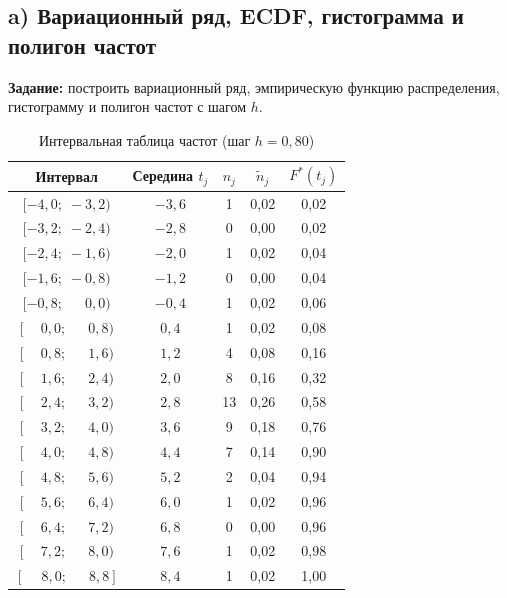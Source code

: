 \documentclass[12pt,a4paper]{article}
\begin{document}
	\subsection{a) Вариационный ряд, ECDF, гистограмма и полигон частот}
	
	\textbf{Задание:} построить вариационный ряд, эмпирическую функцию распределения,
	гистограмму и полигон частот с шагом $h$.
	
	\begin{table}[H]
		\centering
		\small
		\begin{tabular}{ccccc}
			\toprule
			Интервал & Середина $t_j$ & $n_j$ & $\tilde{n}_j$ & $F^*(t_j)$ \\
			\midrule
			$[-4{,}0;\;-3{,}2)$ & $-3{,}6$ &  1 & 0{,}02 & 0{,}02 \\
			$[-3{,}2;\;-2{,}4)$ & $-2{,}8$ &  0 & 0{,}00 & 0{,}02 \\
			$[-2{,}4;\;-1{,}6)$ & $-2{,}0$ &  1 & 0{,}02 & 0{,}04 \\
			$[-1{,}6;\;-0{,}8)$ & $-1{,}2$ &  0 & 0{,}00 & 0{,}04 \\
			$[-0{,}8;\;\phantom{-}0{,}0)$ & $-0{,}4$ & 1 & 0{,}02 & 0{,}06 \\
			$[\phantom{-}0{,}0;\;\phantom{-}0{,}8)$ & $0{,}4$ & 1 & 0{,}02 & 0{,}08 \\
			$[\phantom{-}0{,}8;\;\phantom{-}1{,}6)$ & $1{,}2$ & 4 & 0{,}08 & 0{,}16 \\
			$[\phantom{-}1{,}6;\;\phantom{-}2{,}4)$ & $2{,}0$ & 8 & 0{,}16 & 0{,}32 \\
			$[\phantom{-}2{,}4;\;\phantom{-}3{,}2)$ & $2{,}8$ & 13 & 0{,}26 & 0{,}58 \\
			$[\phantom{-}3{,}2;\;\phantom{-}4{,}0)$ & $3{,}6$ & 9 & 0{,}18 & 0{,}76 \\
			$[\phantom{-}4{,}0;\;\phantom{-}4{,}8)$ & $4{,}4$ & 7 & 0{,}14 & 0{,}90 \\
			$[\phantom{-}4{,}8;\;\phantom{-}5{,}6)$ & $5{,}2$ & 2 & 0{,}04 & 0{,}94 \\
			$[\phantom{-}5{,}6;\;\phantom{-}6{,}4)$ & $6{,}0$ & 1 & 0{,}02 & 0{,}96 \\
			$[\phantom{-}6{,}4;\;\phantom{-}7{,}2)$ & $6{,}8$ & 0 & 0{,}00 & 0{,}96 \\
			$[\phantom{-}7{,}2;\;\phantom{-}8{,}0)$ & $7{,}6$ & 1 & 0{,}02 & 0{,}98 \\
			$[\phantom{-}8{,}0;\;\phantom{-}8{,}8]$ & $8{,}4$ & 1 & 0{,}02 & 1{,}00 \\
			\bottomrule
		\end{tabular}
		\caption{Интервальная таблица частот (шаг $h=0{,}80$)}
	\end{table}
	
\end{document}
